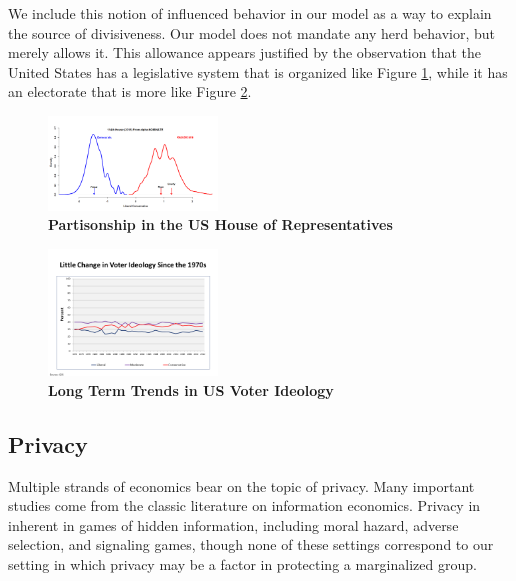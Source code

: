 We include this notion of influenced behavior in our model as a way to explain the source of divisiveness.  Our model does not mandate any herd behavior, but merely allows it.  This allowance appears justified by the observation that the United States has a legislative system that is organized like Figure \ref{fig:partisonship}, while it has an electorate that is more like Figure \ref{fig:voters}.


\begin{figure}[htbp]
\begin{center}
\includegraphics[width=0.4\textwidth]{figs/alpha_House_114_Histogram_8_January_2016}
\caption{{\bf Partisonship in the US House of Representatives}}
\label{fig:partisonship}
\end{center}
\end{figure}




\begin{figure}[htbp]
\begin{center}
\includegraphics[width=0.4\textwidth]{figs/polarization2}
\caption{{\bf Long Term Trends in US Voter Ideology}}
\label{fig:voters}
\end{center}
\end{figure}

\subsection{Privacy}

Multiple strands of economics bear on the topic of privacy.  Many important studies come from the classic literature on information economics.  Privacy in inherent in games of hidden information, including moral hazard, adverse selection, and signaling games, though none of these settings correspond to our setting in which privacy may be a factor in protecting a marginalized group.

